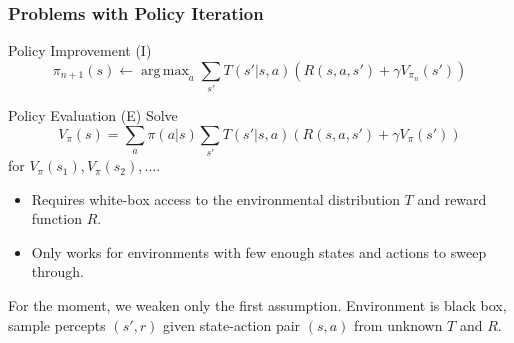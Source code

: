 \documentclass[10pt,a4paper]{beamer}
\DeclareMathOperator*{\argmax}{arg\,max}
\begin{document}
\begin{frame}
    \frametitle{Problems with Policy Iteration}
    
    \begin{block}{Policy Improvement (I)}
        $$
        \pi_{n+1}(s) \leftarrow \argmax_a \sum_{s'} T(s' | s,a) 
        \left( R(s,a,s') + \gamma V_{\pi_n}(s') \right)
        $$
    \end{block}
    
    \begin{block}{Policy Evaluation (E)}
        Solve
        $$
        V_\pi(s) = \sum_{a} \pi(a | s) \sum_{s'} T(s' | s, a) \left( R(s,a,s') + \gamma V_\pi(s') \right) 
        $$ for $V_\pi(s_1), V_\pi(s_2), \ldots$.
    \end{block}
    
    \begin{itemize}
        \item Requires white-box access to the environmental distribution $T$
        and reward function $R$.
        \item Only works for environments with few enough states and actions
        to sweep through.
    \end{itemize}
    \pause
    For the moment, we weaken only the first assumption. Environment
    is black box, sample percepts $(s',r)$ given state-action pair $(s,a)$ from unknown
	$T$ and $R$.
    
\end{frame}
\end{document}
